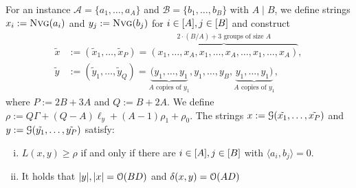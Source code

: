\begin{lemma}
\label{lem:large_lcs_reduce}
For an \ov{} instance $\mathcal{A} = \{a_1, \ldots, a_A\}$ and $\mathcal{B} = \{b_1, \ldots, b_B\}$ with $A \mid B$, we define strings $x_i := \text{\textsc{Nvg}}(a_i)$  and $y_j := \text{\textsc{Nvg}}(b_j)$ for $i \in [A], j \in [B]$ and construct
\begin{align*}
\tilde{x} &:= (\tilde{x}_1, \ldots, \tilde{x}_P) 
= \overbrace{\left(x_1, \ldots, x_A, x_1, \ldots, x_A, \ldots, x_1, \ldots, x_A\right)}^{\text{$2\cdot(B/A)+3$ groups of size $A$}} 
, \\
\tilde{y} &:= (\tilde{y}_1, \ldots, \tilde{y}_Q) 
= \underbrace{(y_1, \ldots, y_1}_{\text{$A$ copies of $y_1$}},
y_1, \ldots, y_B, 
\underbrace{y_1, \ldots, y_1)}_{\text{$A$ copies of $y_1$}}
,
\end{align*}
where $P := 2B + 3A$ and $Q := B + 2A$.
We define $\rho := Q\Gamma + (Q-A)\ell_y + (A-1)\rho_1 + \rho_0$.
The strings $x := \mathcal{G}(\tilde{x_1}, \ldots, \tilde{x_P})$ and $y := \mathcal{G}(\tilde{y_1}, \ldots, \tilde{y_P})$ satisfy:

\begin{enumerate}[(i)]
\item\label{lem:large_lcs_reduce:infer}
$L(x,y) \geq \rho$ if and only if there are $i \in [A], j \in [B]$ with $\langle a_i, b_j \rangle = 0$.
%
\item\label{lem:large_lcs_reduce:size}
It holds that $|y|, |x| = \mathcal{O}(BD)$ and $\delta(x,y) = \mathcal{O}(AD)$
\end{enumerate}
\end{lemma}

